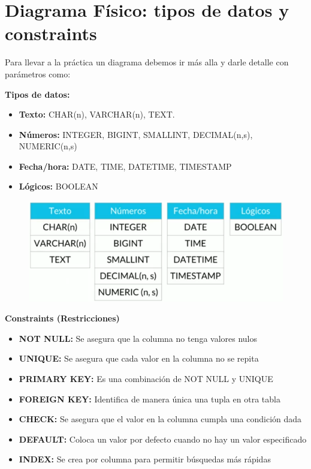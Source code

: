 \documentclass{article}
\begin{document}
\section{Diagrama Físico: tipos de datos y constraints}%
Para llevar a la práctica un diagrama debemos ir más alla y darle detalle con
parámetros como:

\textbf{Tipos de datos:}
\begin{itemize}
  \item \textbf{Texto:} CHAR(n), VARCHAR(n), TEXT.
  \item \textbf{Números:} INTEGER, BIGINT, SMALLINT, DECIMAL(n,s), NUMERIC(n,s)
  \item \textbf{Fecha/hora:} DATE, TIME, DATETIME, TIMESTAMP
  \item \textbf{Lógicos:} BOOLEAN
\end{itemize}

\begin{figure}[h!]
    \centering
      \includegraphics[scale=0.45]{./Pictures/020_tipos_datos.png}
\end{figure}

\textbf{Constraints (Restricciones)}
\begin{itemize}
  \item \textbf{NOT NULL:} Se asegura que la columna no tenga valores nulos
  \item \textbf{UNIQUE:} Se asegura que cada valor en la columna no se repita
  \item \textbf{PRIMARY KEY:} Es una combinación de NOT NULL y UNIQUE
  \item \textbf{FOREIGN KEY:} Identifica de manera única una tupla en otra tabla
  \item \textbf{CHECK:} Se asegura que el valor en la columna cumpla una condición dada
  \item \textbf{DEFAULT:} Coloca un valor por defecto cuando no hay un valor especificado
  \item \textbf{INDEX:} Se crea por columna para permitir búsquedas más rápidas
\end{itemize}
\end{document}
